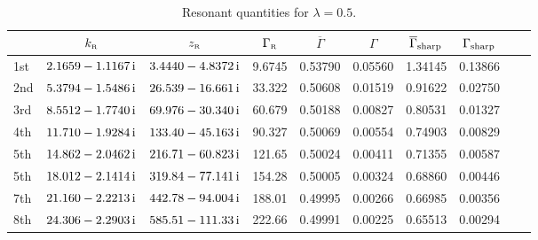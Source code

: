 \documentclass[12pt]{article}
\newcommand{\rmi}{{\rm i}}
\newcommand{\zr}{z_{\text{\tiny R}}}
\newcommand{\gr}{\Gamma _{\text{\tiny R}}}
\newcommand{\kr}{k_{\text{\tiny R}}}
\begin{document}
\begin{table}[ht!]
\centering
\vspace{6pt}
\begin{tabular}{|l| c| c| c| c | c | c | c|c|c|} %
\hline\hline
      & $\kr$ & $\zr$ & $\gr$ & $\overline{\Gamma}$ & $\Gamma$ & 
$\overline{\Gamma}_{\rm sharp}$
& $\Gamma_{\rm sharp}$  \\
\hline



1st & $2.1659 -1.1167 \, \rmi$ & $3.4440 -4.8372 \, \rmi$ & 
9.6745 & 0.53790 & 0.05560 & 1.34145 & 0.13866  \\

2nd & $5.3794 -1.5486 \, \rmi$ & $26.539 -16.661 \, \rmi$ & 
33.322 & 0.50608 & 0.01519 & 0.91622 & 0.02750  \\

3rd & $8.5512 -1.7740 \, \rmi$ & $69.976 -30.340 \, \rmi$ & 
60.679 & 0.50188 & 0.00827 & 0.80531 & 0.01327  \\

4th & $11.710 -1.9284 \, \rmi$ & $133.40 -45.163 \, \rmi$ & 
90.327 & 0.50069 & 0.00554 & 0.74903 & 0.00829  \\

5th & $14.862 -2.0462 \, \rmi$ & $216.71 -60.823 \, \rmi$ & 
121.65 & 0.50024 & 0.00411 & 0.71355 & 0.00587  \\


5th & $18.012 -2.1414 \, \rmi$ & $319.84 -77.141 \, \rmi$ & 
154.28 & 0.50005 & 0.00324 & 0.68860 & 0.00446  \\

7th & $21.160 -2.2213 \, \rmi$ & $442.78 -94.004 \, \rmi$ & 
188.01 & 0.49995 & 0.00266 & 0.66985 & 0.00356 \\

8th & $24.306 -2.2903 \, \rmi$ & $585.51 -111.33 \, \rmi$ & 
222.66 & 0.49991 & 0.00225 & 0.65513 & 0.00294  \\



\hline\hline 
\end{tabular}
\caption{Resonant quantities for $\lambda =0.5$.}
\label{table:0.5}
\end{table}



\newpage
\end{document}

